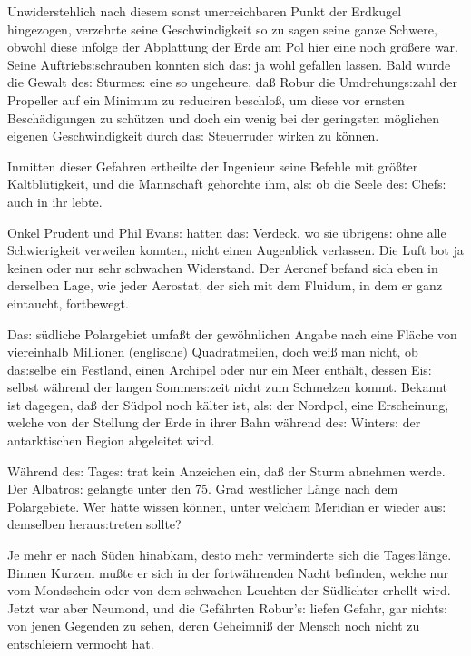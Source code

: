 \documentclass[oneside,12pt]{book}
\newcommand{\s}{s:}
\begin{document}
Unwiderstehlich nach diesem sonst unerreichbaren Punkt der Erdkugel
hingezogen, {\glqq}verzehrte{\grqq} seine Geschwindigkeit so zu sagen
seine ganze Schwere, obwohl diese infolge der Abplattung der Erde am
Pol hier eine noch gr\"o{\ss}ere war. Seine Auftrieb{\s}schrauben
konnten sich da{\s} ja wohl gefallen lassen. Bald wurde die Gewalt
de{\s} Sturme{\s} eine so ungeheure, da{\ss} Robur die Umdrehung{\s}zahl
der Propeller auf ein Minimum zu reduciren beschlo{\ss}, um diese vor
ernsten Besch\"adigungen zu sch\"utzen und doch ein wenig bei der
geringsten m\"oglichen eigenen Geschwindigkeit durch da{\s}
Steuerruder wirken zu k\"onnen.

Inmitten dieser Gefahren ertheilte der Ingenieur seine Befehle mit
gr\"o{\ss}ter Kaltbl\"utigkeit, und die Mannschaft gehorchte ihm,
al{\s} ob die Seele de{\s} Chef{\s} auch in ihr lebte.

Onkel Prudent und Phil Evan{\s} hatten da{\s} Verdeck, wo sie
\"ubrigen{\s} ohne alle Schwierigkeit verweilen konnten, nicht einen
Augenblick verlassen. Die Luft bot ja keinen oder nur sehr schwachen
Widerstand. Der Aeronef befand sich eben in derselben Lage, wie jeder
Aerostat, der sich mit dem Fluidum, in dem er ganz eintaucht,
fortbewegt.

Da{\s} s\"udliche Polargebiet umfa{\ss}t der gew\"ohnlichen Angabe
nach eine Fl\"ache von viereinhalb Millionen (englische)
Quadratmeilen, doch wei{\ss} man nicht, ob da{\s}selbe ein Festland,
einen Archipel oder nur ein Meer enth\"alt, dessen Ei{\s} selbst
w\"ahrend der langen Sommer{\s}zeit nicht zum Schmelzen kommt.
Bekannt ist dagegen, da{\ss} der S\"udpol noch k\"alter ist, al{\s}
der Nordpol, eine Erscheinung, welche von der Stellung der Erde in
ihrer Bahn w\"ahrend de{\s} Winter{\s} der antarktischen Region
abgeleitet wird.

W\"ahrend de{\s} Tage{\s} trat kein Anzeichen ein, da{\ss} der Sturm
abnehmen werde. Der {\glqq}Albatro{\s}{\grqq} gelangte unter den 75.
Grad westlicher L\"ange nach dem Polargebiete. Wer h\"atte wissen
k\"onnen, unter welchem Meridian er wieder au{\s} demselben
herau{\s}treten sollte?

Je mehr er nach S\"uden hinabkam, desto mehr verminderte sich die
Tage{\s}l\"ange. Binnen Kurzem mu{\ss}te er sich in der
fortw\"ahrenden Nacht befinden, welche nur vom Mondschein oder von
dem schwachen Leuchten der S\"udlichter erhellt wird. Jetzt war aber
Neumond, und die Gef\"ahrten Robur'{\s} liefen Gefahr, gar nicht{\s}
von jenen Gegenden zu sehen, deren Geheimni{\ss} der Mensch noch
nicht zu entschleiern vermocht hat.
\end{document}
